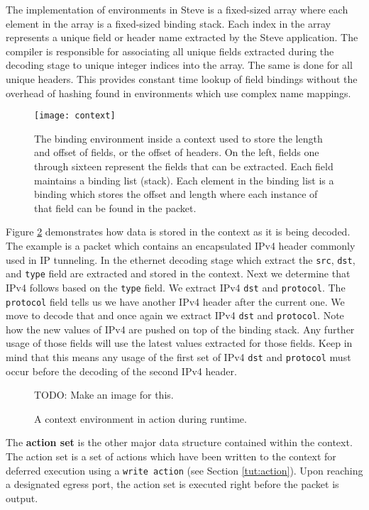 The implementation of environments in Steve is a fixed-sized array where each element in the array is a fixed-sized binding stack. Each index in the array represents a unique field or header name extracted by the Steve application. The compiler is responsible for associating all unique fields extracted during the decoding stage to unique integer indices into the array. The same is done for all unique headers. This provides constant time lookup of field bindings without the overhead of hashing found in environments which use complex name mappings.

\begin{figure}
\texttt{[image: context]}
\caption{The binding environment inside a context used to store the length and offset of fields, or the offset of headers. On the left, fields one through sixteen represent the fields that can be extracted. Each field maintains a binding list (stack). Each element in the binding list is a binding which stores the offset and length where each instance of that field can be found in the packet. }
\label{fg:ContextEnv}
\end{figure}

Figure \ref{fg:ContextEnvWorking} demonstrates how data is stored in the context as it is being decoded. The example is a packet which contains an encapsulated IPv4 header commonly used in IP tunneling. In the ethernet decoding stage which extract the \texttt{src}, \texttt{dst}, and \texttt{type} field are extracted and stored in the context. Next we determine that IPv4 follows based on the \texttt{type} field. We extract IPv4 \texttt{dst} and \texttt{protocol}. The \texttt{protocol} field tells us we have another IPv4 header after the current one. We move to decode that and once again we extract IPv4 \texttt{dst} and \texttt{protocol}. Note how the new values of IPv4 are pushed on top of the binding stack. Any further usage of those fields will use the latest values extracted for those fields. Keep in mind that this means any usage of the first set of IPv4 \texttt{dst} and \texttt{protocol} must occur before the decoding of the second IPv4 header.\

\begin{figure}
TODO: Make an image for this.
\caption{A context environment in action during runtime.}
\label{fg:ContextEnvWorking}
\end{figure}

The \textbf{action set} is the other major data structure contained within the context. The action set is a set of actions which have been written to the context for deferred execution using a \texttt{write action} (see Section \ref{tut:action}). Upon reaching a designated egress port, the action set is executed right before the packet is output.

